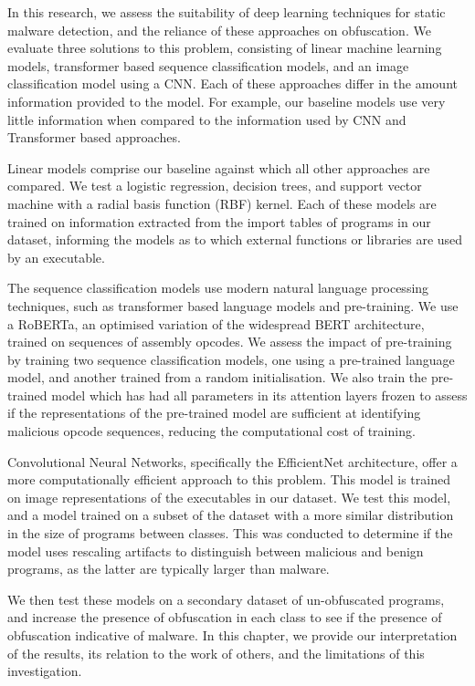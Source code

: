 \documentclass[main.tex]{subfiles}
\begin{document}

\noindent
In this research, we assess the suitability of deep learning techniques for static malware detection, and the reliance of these approaches on obfuscation. We evaluate three solutions to this problem, consisting of linear machine learning models, transformer based sequence classification models, and an image classification model using a CNN. Each of these approaches differ in the amount information provided to the model. For example, our baseline models use very little information when compared to the information used by CNN and Transformer based approaches. 

Linear models comprise our baseline against which all other approaches are compared. We test a logistic regression, decision trees, and support vector machine with a radial basis function (RBF) kernel. Each of these models are trained on information extracted from the import tables of programs in our dataset, informing the models as to which external functions or libraries are used by an executable. 

The sequence classification models use modern natural language processing techniques, such as transformer based language models and pre-training. We use a RoBERTa, an optimised variation of the widespread BERT architecture, trained on sequences of assembly opcodes. We assess the impact of pre-training by training two sequence classification models, one using a pre-trained language model, and another trained from a random initialisation. We also train the pre-trained model which has had all parameters in its attention layers frozen to assess if the representations of the pre-trained model are sufficient at identifying malicious opcode sequences, reducing the computational cost of training. 

Convolutional Neural Networks, specifically the EfficientNet architecture, offer a more computationally efficient approach to this problem. This model is trained on image representations of the executables in our dataset. We test this model, and a model trained on a subset of the dataset with a more similar distribution in the size of programs between classes. This was conducted to determine if the model uses rescaling artifacts to distinguish between malicious and benign programs, as the latter are typically larger than malware. 

We then test these models on a secondary dataset of un-obfuscated programs, and increase the presence of obfuscation in each class to see if the presence of obfuscation indicative of malware. In this chapter, we provide our interpretation of the results, its relation to the work of others, and the limitations of this investigation. 
\end{document}
